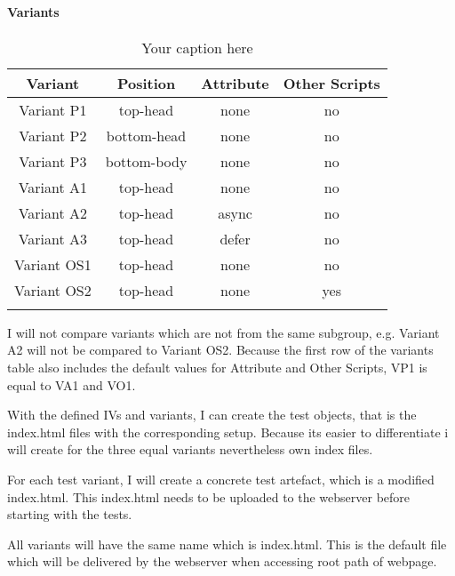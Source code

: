 \paragraph{Variants}

\begin{center}
	\begin{longtable}{ |c|c|c|c|  }
	\hline
	Variant & Position & Attribute & Other Scripts \\
	\hline
	Variant P1 & top-head & \cellcolor{lightgrey} none & \cellcolor{lightgrey} no \\
	   Variant P2 & bottom-head & \cellcolor{lightgrey} none & \cellcolor{lightgrey} no \\
	   Variant P3 & bottom-body & \cellcolor{lightgrey} none & \cellcolor{lightgrey} no \\
	  \hline
	   Variant A1 & \cellcolor{lightgrey} top-head & none & \cellcolor{lightgrey} no \\
	   Variant A2 & \cellcolor{lightgrey} top-head & async & \cellcolor{lightgrey} no \\
	   Variant A3 & \cellcolor{lightgrey} top-head & defer & \cellcolor{lightgrey} no \\
	  \hline
	  Variant OS1 & \cellcolor{lightgrey} top-head & \cellcolor{lightgrey} none & no \\
	  Variant OS2 & \cellcolor{lightgrey} top-head & \cellcolor{lightgrey} none & yes \\
	  \hline
	\caption{Your caption here} %
	\label{tab:myfirstlongtable}
	\end{longtable}
\end{center}


I will not compare variants which are not from the same subgroup, e.g. Variant A2 will not be compared to Variant OS2.
Because the first row of the variants table also includes the default values for Attribute and Other Scripts, VP1 is equal to VA1 and VO1.

With the defined IVs and variants, I can create the test objects, that is the index.html files with the corresponding setup.
Because its easier to differentiate i will create for the three equal variants nevertheless own index files.

For each test variant, I will create a concrete test artefact, which is a modified index.html.
This index.html needs to be uploaded to the webserver before starting with the tests.

All variants will have the same name which is index.html. This is the default file which will be delivered by the webserver when accessing root path of webpage.



